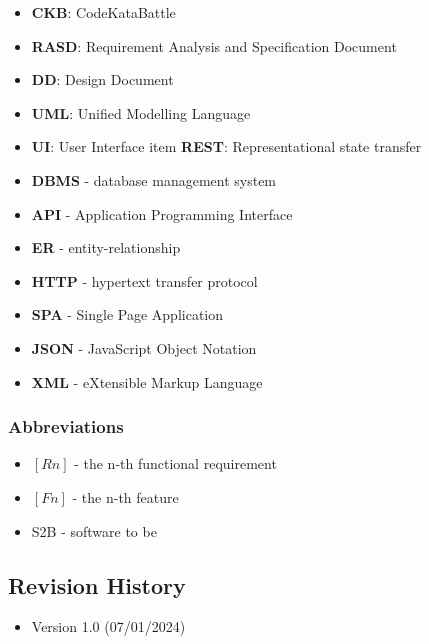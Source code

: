 \begin{itemize}
    \item \textbf{CKB}: CodeKataBattle
    \item \textbf{RASD}: Requirement Analysis and Specification Document 
    \item \textbf{DD}: Design Document
    \item \textbf{UML}: Unified Modelling Language
    \item \textbf{UI}: User Interface
    item \textbf{REST}: Representational state transfer
    \item \textbf{DBMS} - database management system
    \item \textbf{API} - Application Programming Interface
    \item \textbf{ER} - entity-relationship
    \item \textbf{HTTP} - hypertext transfer protocol
    \item \textbf{SPA} - Single Page Application
    \item \textbf{JSON} - JavaScript Object Notation
    \item \textbf{XML} - eXtensible Markup Language
\end{itemize}

\vspace{12pt}

\subsubsection{Abbreviations}

\begin{itemize}
    \item $[Rn]$ - the n-th functional requirement
    \item $[Fn]$ - the n-th feature 
    \item S2B - software to be
\end{itemize}

\vspace{24pt}

\subsection{Revision History}

\begin{itemize}
    \item Version 1.0 (07/01/2024)
\end{itemize}

\vspace{1cm}

